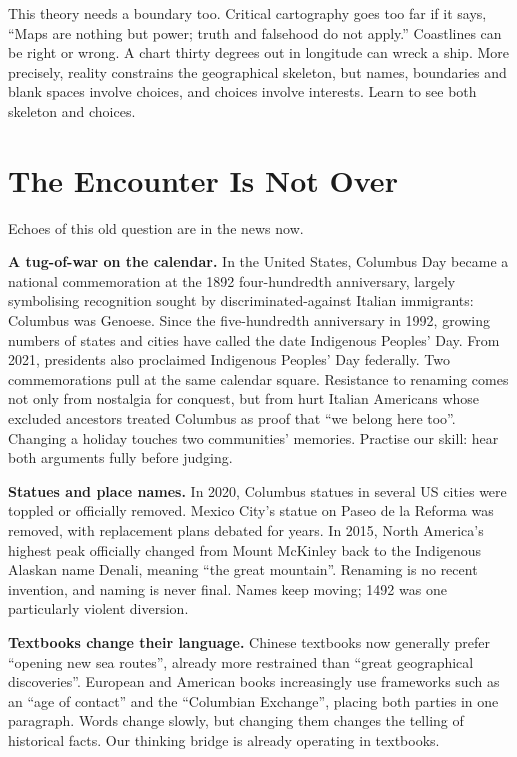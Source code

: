 This theory needs a boundary too. Critical cartography goes too far if it says, ``Maps are nothing but power; truth and falsehood do not apply.'' Coastlines can be right or wrong. A chart thirty degrees out in longitude can wreck a ship. More precisely, reality constrains the geographical skeleton, but names, boundaries and blank spaces involve choices, and choices involve interests. Learn to see both skeleton and choices.

\section{The Encounter Is Not Over}
Echoes of this old question are in the news now.

\textbf{A tug-of-war on the calendar.} In the United States, Columbus Day became a national commemoration at the 1892 four-hundredth anniversary, largely symbolising recognition sought by discriminated-against Italian immigrants: Columbus was Genoese. Since the five-hundredth anniversary in 1992, growing numbers of states and cities have called the date Indigenous Peoples' Day. From 2021, presidents also proclaimed Indigenous Peoples' Day federally. Two commemorations pull at the same calendar square. Resistance to renaming comes not only from nostalgia for conquest, but from hurt Italian Americans whose excluded ancestors treated Columbus as proof that ``we belong here too''. Changing a holiday touches two communities' memories. Practise our skill: hear both arguments fully before judging.

\textbf{Statues and place names.} In 2020, Columbus statues in several US cities were toppled or officially removed. Mexico City's statue on Paseo de la Reforma was removed, with replacement plans debated for years. In 2015, North America's highest peak officially changed from Mount McKinley back to the Indigenous Alaskan name Denali, meaning ``the great mountain''. Renaming is no recent invention, and naming is never final. Names keep moving; 1492 was one particularly violent diversion.

\textbf{Textbooks change their language.} Chinese textbooks now generally prefer ``opening new sea routes'', already more restrained than ``great geographical discoveries''. European and American books increasingly use frameworks such as an ``age of contact'' and the ``Columbian Exchange'', placing both parties in one paragraph. Words change slowly, but changing them changes the telling of historical facts. Our thinking bridge is already operating in textbooks.

